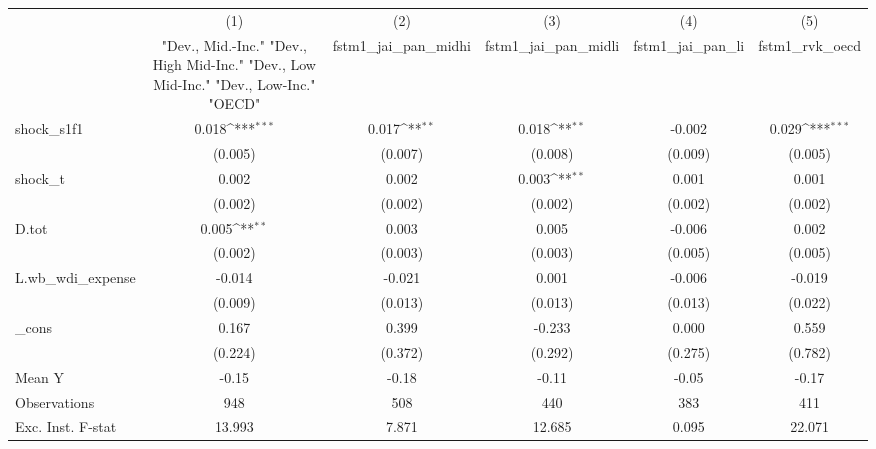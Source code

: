 {
\def\sym#1{\ifmmode^{#1}\else\(^{#1}\)\fi}
\begin{tabular}{l*{5}{c}}
\toprule
            &\multicolumn{1}{c}{(1)}&\multicolumn{1}{c}{(2)}&\multicolumn{1}{c}{(3)}&\multicolumn{1}{c}{(4)}&\multicolumn{1}{c}{(5)}\\
            &\multicolumn{1}{c}{ "Dev., Mid.-Inc." "Dev., High Mid-Inc." "Dev., Low Mid-Inc." "Dev., Low-Inc." "OECD" }&\multicolumn{1}{c}{fstm1\_jai\_pan\_midhi}&\multicolumn{1}{c}{fstm1\_jai\_pan\_midli}&\multicolumn{1}{c}{fstm1\_jai\_pan\_li}&\multicolumn{1}{c}{fstm1\_rvk\_oecd}\\
\midrule
shock\_s1f1  &       0.018\sym{***}&       0.017\sym{**} &       0.018\sym{**} &      -0.002         &       0.029\sym{***}\\
            &     (0.005)         &     (0.007)         &     (0.008)         &     (0.009)         &     (0.005)         \\
\addlinespace
shock\_t     &       0.002         &       0.002         &       0.003\sym{**} &       0.001         &       0.001         \\
            &     (0.002)         &     (0.002)         &     (0.002)         &     (0.002)         &     (0.002)         \\
\addlinespace
D.tot       &       0.005\sym{**} &       0.003         &       0.005         &      -0.006         &       0.002         \\
            &     (0.002)         &     (0.003)         &     (0.003)         &     (0.005)         &     (0.005)         \\
\addlinespace
L.wb\_wdi\_expense&      -0.014         &      -0.021         &       0.001         &      -0.006         &      -0.019         \\
            &     (0.009)         &     (0.013)         &     (0.013)         &     (0.013)         &     (0.022)         \\
\addlinespace
\_cons      &       0.167         &       0.399         &      -0.233         &       0.000         &       0.559         \\
            &     (0.224)         &     (0.372)         &     (0.292)         &     (0.275)         &     (0.782)         \\
\midrule
Mean Y      &       -0.15         &       -0.18         &       -0.11         &       -0.05         &       -0.17         \\
Observations&         948         &         508         &         440         &         383         &         411         \\
Exc. Inst. F-stat&      13.993         &       7.871         &      12.685         &       0.095         &      22.071         \\
\bottomrule
\end{tabular}
}
